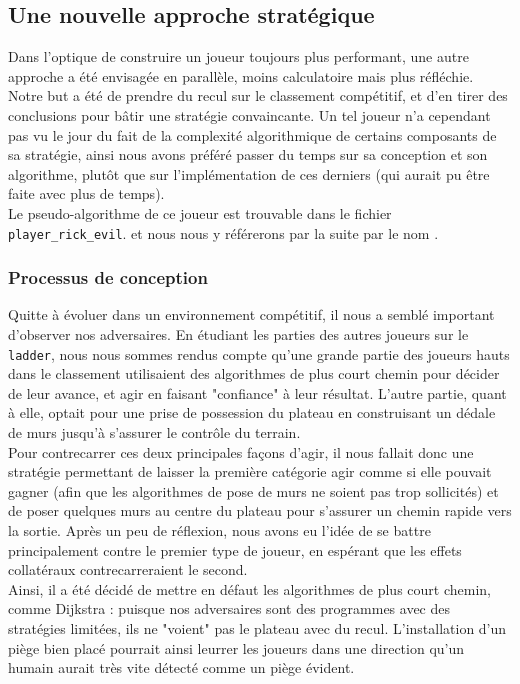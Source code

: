 \documentclass[a4paper]{article}
\begin{document}
 
 \subsection{Une nouvelle approche stratégique}
 
 Dans l'optique de construire un joueur toujours plus performant, une autre approche a été envisagée en parallèle, moins calculatoire mais plus réfléchie. Notre but a été de prendre du recul sur le classement compétitif, et d'en tirer des conclusions pour bâtir une stratégie convaincante. Un tel joueur n'a cependant pas vu le jour du fait de la complexité algorithmique de certains composants de sa stratégie, ainsi nous avons préféré passer du temps sur sa conception et son algorithme, plutôt que sur l'implémentation de ces derniers (qui aurait pu être faite avec plus de temps). \\
 
Le pseudo-algorithme de ce joueur est trouvable dans le fichier \texttt{player\_rick\_evil}. et nous nous y référerons par la suite par le nom .

\subsubsection{Processus de conception}

Quitte à évoluer dans un environnement compétitif, il nous a semblé important d'observer nos adversaires. En étudiant les parties des autres joueurs sur le \texttt{ladder}, nous nous sommes rendus compte qu'une grande partie des joueurs hauts dans le classement utilisaient des algorithmes de plus court chemin pour décider de leur avance, et agir en faisant "confiance" à leur résultat. L'autre partie, quant à elle, optait pour une prise de possession du plateau en construisant un dédale de murs jusqu'à s'assurer le contrôle du terrain. \\

Pour contrecarrer ces deux principales façons d'agir, il nous fallait donc une stratégie permettant de laisser la première catégorie agir comme si elle pouvait gagner (afin que les algorithmes de pose de murs ne soient pas trop sollicités) et de poser quelques murs au centre du plateau pour s'assurer un chemin rapide vers la sortie. Après un peu de réflexion, nous avons eu l'idée de se battre principalement contre le premier type de joueur, en espérant que les effets collatéraux contrecarreraient le second. \\

Ainsi, il a été décidé de mettre en défaut les algorithmes de plus court chemin, comme Dijkstra : puisque nos adversaires sont des programmes avec des stratégies limitées, ils ne "voient" pas le plateau avec du recul. L'installation d'un piège bien placé pourrait ainsi leurrer les joueurs dans une direction qu'un humain aurait très vite détecté comme un piège évident. \\
\end{document}
